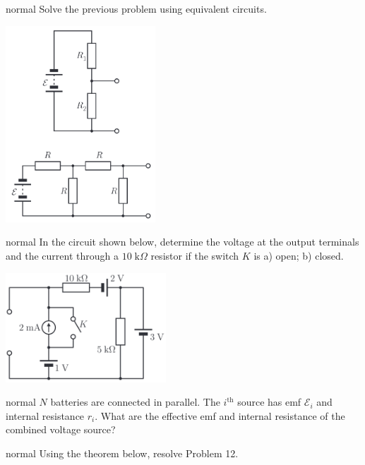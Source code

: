 \hypertarget{P19}{}
\begin{solution}{normal} %
Solve the previous problem using equivalent circuits.
\begin{center}
    \includegraphics[width=0.42\textwidth]{S1 Figures/S1-18-19.png}
\end{center}
\end{solution}

\hypertarget{P20}{}
\begin{solution}{normal} %
In the circuit shown below, determine the voltage at the output terminals and the current through a $10\;\text{k}\Omega$ resistor if the switch $K$ is a) open; b) closed.
\begin{center}
    \includegraphics[width=0.45\textwidth]{S1 Figures/S1-20.png}
\end{center}
\end{solution}

\hypertarget{P21}{}
\begin{solution}{normal} %
$N$ batteries are connected in parallel. The $i^\text{th}$ source has emf $\mathcal{E}_i$ and internal resistance $r_i$. What are the effective emf and internal resistance of the combined voltage source?
\end{solution}

\hypertarget{P22}{}
\begin{solution}{normal} %
Using the theorem below, resolve Problem 12.
\end{solution}

